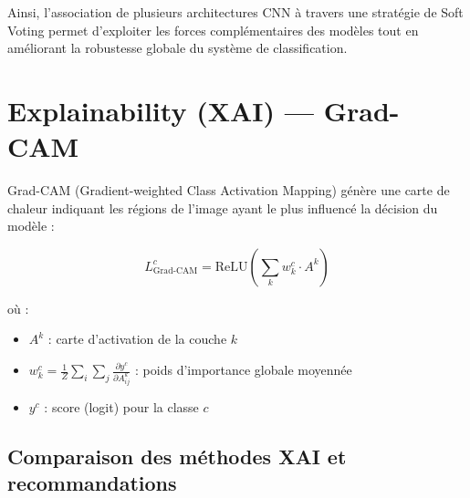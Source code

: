 \documentclass[12pt,a4paper,oneside]{report}
\begin{document}
Ainsi, l'association de plusieurs architectures CNN à travers une stratégie de Soft Voting permet d'exploiter les forces complémentaires des modèles tout en améliorant la robustesse globale du système de classification.

\section{Explainability (XAI) --- Grad-CAM}

Grad-CAM (Gradient-weighted Class Activation Mapping) \cite{selvaraju2017grad}
génère une carte de chaleur indiquant les régions de l'image ayant le plus
influencé la décision du modèle :

\begin{equation}
L^c_{\text{Grad-CAM}} = \text{ReLU}\left(\sum_k w_k^c \cdot A^k\right)
\label{eq:gradcam}
\end{equation}

où :
\begin{itemize}
    \item $A^k$ : carte d'activation de la couche $k$
    \item $w_k^c = \frac{1}{Z} \sum_i \sum_j \frac{\partial y^c}{\partial A^k_{ij}}$ :
          poids d'importance globale moyennée
    \item $y^c$ : score (logit) pour la classe $c$
\end{itemize}

\subsection{Comparaison des méthodes XAI et recommandations}
\end{document}
